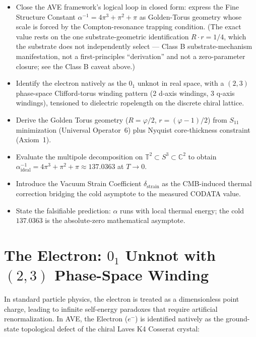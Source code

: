 \begin{objectivebox}
\begin{itemize}
    \item Close the AVE framework's logical loop in closed form: express the Fine Structure Constant $\alpha^{-1} = 4\pi^3 + \pi^2 + \pi$ as Golden-Torus geometry whose scale is forced by the Compton-resonance trapping condition. (The exact value rests on the one substrate-geometric identification $R \cdot r = 1/4$, which the substrate does not independently select --- Class B substrate-mechanism manifestation, not a first-principles ``derivation'' and not a zero-parameter closure; see the Class B caveat above.)
    \item Identify the electron natively as the $0_1$ unknot in real space, with a $(2,3)$ phase-space Clifford-torus winding pattern (2 d-axis windings, 3 q-axis windings), tensioned to dielectric ropelength on the discrete chiral lattice.
    \item Derive the Golden Torus geometry ($R = \varphi/2$, $r = (\varphi-1)/2$) from $S_{11}$ minimization (Universal Operator~6) plus Nyquist core-thickness constraint (Axiom~1).
    \item Evaluate the multipole decomposition on $\mathbb{T}^2 \subset S^3 \subset \mathbb{C}^2$ to obtain $\alpha^{-1}_{\text{ideal}} = 4\pi^3 + \pi^2 + \pi \approx 137.0363$ at $T \to 0$.
    \item Introduce the Vacuum Strain Coefficient $\delta_{\text{strain}}$ as the CMB-induced thermal correction bridging the cold asymptote to the measured CODATA value.
    \item State the falsifiable prediction: $\alpha$ runs with local thermal energy; the cold $137.0363$ is the absolute-zero mathematical asymptote.
\end{itemize}
\end{objectivebox}

\section{The Electron: $0_1$ Unknot with $(2,3)$ Phase-Space Winding}
\label{sec:electron_trefoil}

In standard particle physics, the electron is treated as a dimensionless point charge, leading to infinite self-energy paradoxes that require artificial renormalization. In AVE, the Electron ($e^-$) is identified natively as the ground-state topological defect of the chiral Laves K4 Cosserat crystal:

